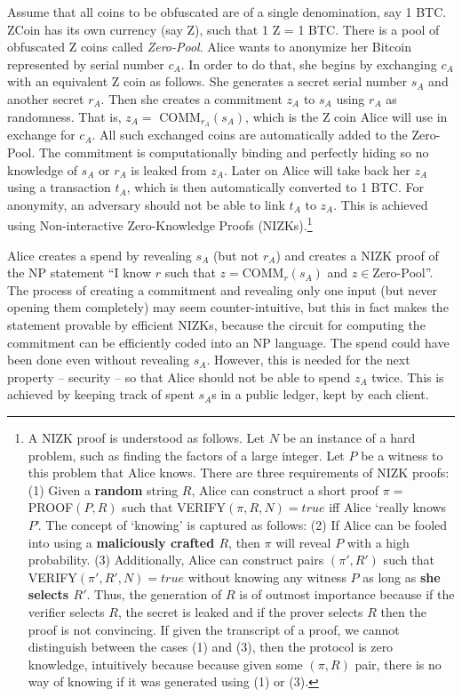\documentclass[]{report}   %
\begin{document}
Assume that all coins to be obfuscated are of a single denomination, say 1 BTC. ZCoin has its own currency (say Z), such that 1 Z = 1 BTC. There is a pool of obfuscated Z coins called {\em Zero-Pool}. Alice wants to anonymize her Bitcoin represented by serial number $c_A$. In order to do that, she begins by exchanging $c_A$ with an equivalent Z coin as follows. She generates a secret serial number $s_A$ and another secret $r_A$. Then she creates a commitment $z_A$ to $s_A$ using $r_A$ as randomness. That is, $z_A=$ COMM$_{r_A}(s_A)$, which is the Z coin Alice will use in exchange for $c_A$. All such exchanged coins are automatically added to the Zero-Pool. The commitment is computationally binding and perfectly hiding so no knowledge of $s_A$ or $r_A$ is leaked from $z_A$. Later on Alice will take back her $z_A$ using a transaction $t_A$, which is then automatically converted to 1 BTC. For anonymity, an adversary should not be able to link $t_A$ to $z_A$. This is achieved using Non-interactive Zero-Knowledge Proofs (NIZKs).\footnote{A NIZK proof is understood as follows. Let $N$ be an instance of a hard problem, such as finding the factors of a large integer. Let $P$ be a witness to this problem that Alice knows. There are three requirements of NIZK proofs: (1) Given a \textbf{random} string $R$, Alice can construct a short proof $\pi=$ PROOF$(P, R)$ such that VERIFY$(\pi, R, N)=true$ iff Alice `really knows $P$'. The concept of `knowing' is captured as follows: (2) If Alice can be fooled into using a \textbf{maliciously crafted $R$}, then $\pi$ will reveal $P$ with a high probability. (3) Additionally, Alice can construct pairs $(\pi', R')$ such that VERIFY$(\pi', R', N) = true$ without knowing any witness $P$ as long as \textbf{she selects $R'$}. Thus, the generation of $R$ is of outmost importance because if the verifier selects $R$, the secret is leaked and if the prover selects $R$ then the proof is not convincing. If given the transcript of a proof, we cannot distinguish between the cases (1) and (3), then the protocol is zero knowledge, intuitively because because given some $(\pi, R)$ pair, there is no way of knowing if it was generated using (1) or (3).}

Alice creates a spend by revealing $s_A$ (but not $r_A$) and creates a NIZK proof of the NP statement ``I know $r$ such that $z=\text{COMM}_r(s_A)$ and $z \in \text{Zero-Pool}$''. The process of creating a commitment and revealing only one input (but never opening them completely) may seem counter-intuitive, but this in fact makes the statement provable by efficient NIZKs, because the circuit for computing the commitment can be efficiently coded into an NP language. The spend could have been done even without revealing $s_A$. However, this is needed for the next property -- security -- so that Alice should not be able to spend $z_A$ twice. This is achieved by keeping track of spent $s_A$s in a public ledger, kept by each client. 
\end{document}
